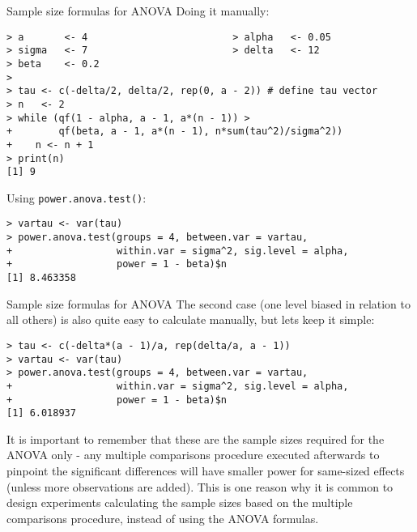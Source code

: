 
\begin{frame}[fragile]
{Sample size formulas for ANOVA}
{Doing it manually:}

{\smaller
\begin{verbatim}
> a       <- 4                         > alpha   <- 0.05
> sigma   <- 7                         > delta   <- 12
> beta    <- 0.2
>
> tau <- c(-delta/2, delta/2, rep(0, a - 2)) # define tau vector
> n   <- 2
> while (qf(1 - alpha, a - 1, a*(n - 1)) >
+        qf(beta, a - 1, a*(n - 1), n*sum(tau^2)/sigma^2))
+    n <- n + 1
> print(n)
[1] 9
\end{verbatim}}

Using \verb|power.anova.test()|:
{\smaller
\begin{verbatim}
> vartau <- var(tau)
> power.anova.test(groups = 4, between.var = vartau,
+                  within.var = sigma^2, sig.level = alpha,
+                  power = 1 - beta)$n
[1] 8.463358
\end{verbatim}}
\end{frame}

\begin{frame}[fragile]{Sample size formulas for ANOVA}
The second case (one level biased in relation to all others) is also quite easy to calculate manually, but lets keep it simple:

{\smaller
\begin{verbatim}
> tau <- c(-delta*(a - 1)/a, rep(delta/a, a - 1))
> vartau <- var(tau)
> power.anova.test(groups = 4, between.var = vartau,
+                  within.var = sigma^2, sig.level = alpha,
+                  power = 1 - beta)$n
[1] 6.018937
\end{verbatim}}

It is important to remember that these are the sample sizes required for the ANOVA only - any multiple comparisons procedure executed afterwards to pinpoint the significant differences will have smaller power for same-sized effects (unless more observations are added). This is one reason why it is common to design experiments calculating the sample sizes based on the multiple comparisons procedure, instead of using the ANOVA formulas.
\end{frame}

